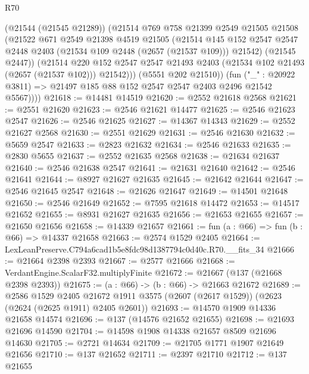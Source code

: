 \begin{lexlean}{R70}
\begin{coremodule}
              (@21544 (@21545 @21289))
              (@21514
                @769
                @758
                @21399
                @2549
                @21505
                @21508
                (@21522
                  @671
                  @2549
                  @21398
                  @4519
                  @21505
                  (@21514
                    @145
                    @152
                    @2547
                    @2547
                    @2448
                    @2403
                    (@21534 @109 @2448 (@2657 (@21537 @109)))
                    @21542)
                  (@21545 @2447))
                (@21514
                  @220
                  @152
                  @2547
                  @2547
                  @21493
                  @2403
                  (@21534 @102 @21493 (@2657 (@21537 @102)))
                  @21542)))
            (@5551 @202 @21510))
          (fun ("_" : @20922 @3811) => @21497 @185 @88 @152 @2547 @2547 @2403 @2496 @21542 @5567))))
@21618 := @14481 @14519
@21620 := @2552 @21618 @2568
@21621 := @2551 @21620
@21623 := @2546 @21621 @14477
@21625 := @2546 @21623 @2547
@21626 := @2546 @21625
@21627 := @14367 @14343
@21629 := @2552 @21627 @2568
@21630 := @2551 @21629
@21631 := @2546 @21630
@21632 := @5659 @2547
@21633 := @2823 @21632
@21634 := @2546 @21633
@21635 := @2830 @5655
@21637 := @2552 @21635 @2568
@21638 := @21634 @21637
@21640 := @2546 @21638 @2547
@21641 := @21631 @21640
@21642 := @2546 @21641
@21644 := @8927 @21627 @21635
@21645 := @21642 @21644
@21647 := @2546 @21645 @2547
@21648 := @21626 @21647
@21649 := @14501 @21648
@21650 := @2546 @21649
@21652 := @7595 @21618 @14472
@21653 := @14517 @21652
@21655 := @8931 @21627 @21635
@21656 := @21653 @21655
@21657 := @21650 @21656
@21658 := @14339 @21657
@21661 := fun (a : @66) => fun (b : @66) => @14337 @21658
@21663 := @2574 @1529 @2405
@21664 := LexLeanPreserve.C794a6cad1b5e8fdc98d1387794c0d40c.R70.__fits_34
@21666 := @21664 @2398 @2393
@21667 := @2577 @21666
@21668 := VerdantEngine.ScalarF32.multiplyFinite
@21672 := @21667 (@137 (@21668 @2398 @2393))
@21675 := (a : @66) -> (b : @66) -> @21663 @21672
@21689 := @2586
    @1529
    @2405
    @21672
    @1911
    @3575
    (@2607 (@2617 @1529))
    (@2623 (@2624 (@2625 @1911) @2405 @2601))
@21693 := @14570 @1909 @14336 @21658 @14574
@21696 := @137 (@14576 @21652 @21655)
@21698 := @21693 @21696 @14590
@21704 := @14598 @1908 @14338 @21657 @8509 @21696 @14630
@21705 := @2721 @14634
@21709 := @21705 @1771 @1907 @21649 @21656
@21710 := @137 @21652
@21711 := @2397 @21710
@21712 := @137 @21655

\end{coremodule}
\end{lexlean}
